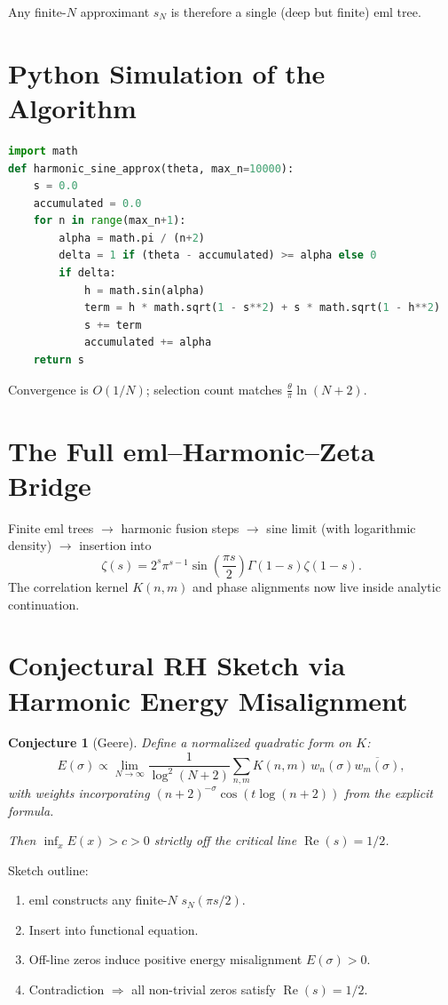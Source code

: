 \documentclass[11pt,a4paper]{article}
\newtheorem{conjecture}{Conjecture}
\begin{document}
Any finite-\(N\) approximant \(s_N\) is therefore a single (deep but finite) eml tree.

\section{Python Simulation of the Algorithm}
\begin{lstlisting}[language=Python, caption=Harmonic sine approximant]
import math
def harmonic_sine_approx(theta, max_n=10000):
    s = 0.0
    accumulated = 0.0
    for n in range(max_n+1):
        alpha = math.pi / (n+2)
        delta = 1 if (theta - accumulated) >= alpha else 0
        if delta:
            h = math.sin(alpha)
            term = h * math.sqrt(1 - s**2) + s * math.sqrt(1 - h**2)
            s += term
            accumulated += alpha
    return s
\end{lstlisting}

Convergence is \(O(1/N)\); selection count matches \(\frac{\theta}{\pi}\ln(N+2)\).

\section{The Full eml–Harmonic–Zeta Bridge}
Finite eml trees \(\to\) harmonic fusion steps \(\to\) sine limit (with logarithmic density) \(\to\) insertion into
\[
\zeta(s) = 2^s \pi^{s-1} \sin\left(\frac{\pi s}{2}\right) \Gamma(1-s) \zeta(1-s).
\]
The correlation kernel \(K(n,m)\) and phase alignments now live inside analytic continuation.

\section{Conjectural RH Sketch via Harmonic Energy Misalignment}
\begin{conjecture}[Geere]
Define a normalized quadratic form on \(K\):
\[
E(\sigma) \propto \lim_{N\to\infty} \frac{1}{\log^2(N+2)} \sum_{n,m} K(n,m) \, w_n(\sigma) \overline{w_m(\sigma)},
\]
with weights incorporating \((n+2)^{-\sigma} \cos(t \log(n+2))\) from the explicit formula.

Then \(\inf_x E(x) > c > 0\) strictly off the critical line \(\operatorname{Re}(s)=1/2\).
\end{conjecture}

Sketch outline:
\begin{enumerate}
\item eml constructs any finite-\(N\) \(s_N(\pi s/2)\).
\item Insert into functional equation.
\item Off-line zeros induce positive energy misalignment \(E(\sigma)>0\).
\item Contradiction \(\Rightarrow\) all non-trivial zeros satisfy \(\operatorname{Re}(s)=1/2\).
\end{enumerate}
\end{document}
